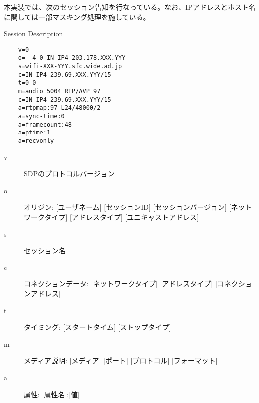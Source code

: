 本実装では、次のセッション告知を行なっている。なお、IPアドレスとホスト名に関しては一部マスキング処理を施している。

\begin{itembox}[l]{Session Description}
  \begin{verbatim}
    v=0
    o=- 4 0 IN IP4 203.178.XXX.YYY
    s=wifi-XXX-YYY.sfc.wide.ad.jp
    c=IN IP4 239.69.XXX.YYY/15
    t=0 0
    m=audio 5004 RTP/AVP 97
    c=IN IP4 239.69.XXX.YYY/15
    a=rtpmap:97 L24/48000/2
    a=sync-time:0
    a=framecount:48
    a=ptime:1
    a=recvonly
  \end{verbatim}
\end{itembox}

\begin{description}
  \item[v] SDPのプロトコルバージョン
  \item[o] オリジン: [ユーザネーム] [セッションID] [セッションバージョン] [ネットワークタイプ] [アドレスタイプ] [ユニキャストアドレス]
  \item[s] セッション名
  \item[c] コネクションデータ: [ネットワークタイプ] [アドレスタイプ] [コネクションアドレス]
  \item[t] タイミング: [スタートタイム] [ストップタイプ]
  \item[m] メディア説明: [メディア] [ポート] [プロトコル] [フォーマット]
  \item[a] 属性: [属性名]:[値]
\end{description}
